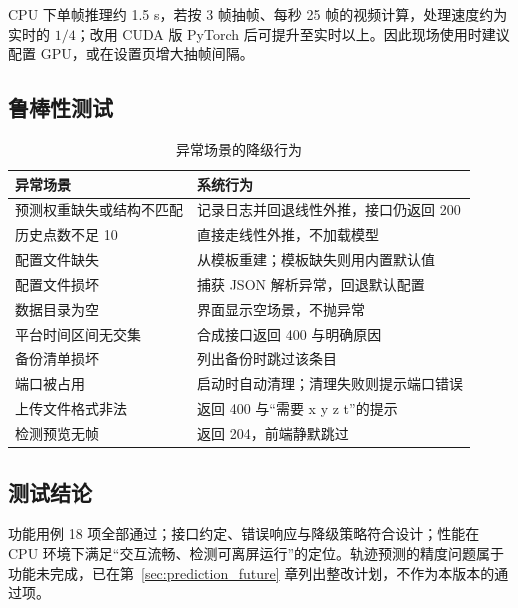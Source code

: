 CPU 下单帧推理约 1.5 s，若按 3 帧抽帧、每秒 25 帧的视频计算，处理速度约为实时的 $1/4$；改用 CUDA 版 PyTorch 后可提升至实时以上。因此现场使用时建议配置 GPU，或在设置页增大抽帧间隔。

\subsection{鲁棒性测试}

\begin{table}[H]
\centering
\caption{异常场景的降级行为}
\label{tab:robust}
\small
\begin{tabularx}{\linewidth}{@{}>{\heiti}p{3.6cm}>{\raggedright\arraybackslash}X@{}}
\toprule
异常场景 & 系统行为 \\
\midrule
预测权重缺失或结构不匹配 & 记录日志并回退线性外推，接口仍返回 200 \\
历史点数不足 10 & 直接走线性外推，不加载模型 \\
配置文件缺失 & 从模板重建；模板缺失则用内置默认值 \\
配置文件损坏 & 捕获 JSON 解析异常，回退默认配置 \\
数据目录为空 & 界面显示空场景，不抛异常 \\
平台时间区间无交集 & 合成接口返回 400 与明确原因 \\
备份清单损坏 & 列出备份时跳过该条目 \\
端口被占用 & 启动时自动清理；清理失败则提示端口错误 \\
上传文件格式非法 & 返回 400 与“需要 x y z t”的提示 \\
检测预览无帧 & 返回 204，前端静默跳过 \\
\bottomrule
\end{tabularx}
\end{table}

\subsection{测试结论}

功能用例 18 项全部通过；接口约定、错误响应与降级策略符合设计；性能在 CPU 环境下满足“交互流畅、检测可离屏运行”的定位。轨迹预测的精度问题属于功能未完成，已在第~\ref{sec:prediction_future} 章列出整改计划，不作为本版本的通过项。
